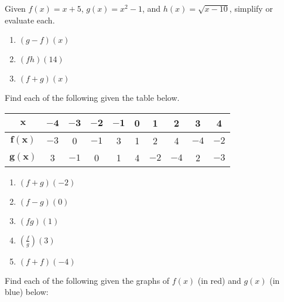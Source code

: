 Given $f(x) = x + 5$, $g(x) = x^2 - 1$, and $h(x) = \sqrt{x-10}$, simplify or evaluate each.
\begin{enumerate}
    \item $(g-f)(x)$
    \item $(fh)(14)$
    \item $(f+g)(x)$
\setcounter{Review}{\value{enumi}}
\end{enumerate}

Find each of the following given the table below.
\begin{center}
\begin{tabular}{c|c|c|c|c|c|c|c|c|c}
    $\bm{x}$ & $\bm{-4}$ & $\bm{-3}$ & $\bm{-2}$ & $\bm{-1}$ & \textbf{0} & \textbf{1} & \textbf{2} & \textbf{3} & \textbf{4} \\ \hline
    $\bm{f(x)}$ & $-3$ & 0 & $-1$ & 3 & 1 & 2 & 4 & $-4$ & $-2$ \\ \hline
    $\bm{g(x)}$ & 3 & $-1$ & 0 & 1 & 4 & $-2$ & $-4$ & 2 & $-3$ \\
\end{tabular}
\end{center}

\begin{multicols}{5}
\begin{enumerate}	\setcounter{enumi}{\value{Review}}
	\item $(f + g)(-2)$
	\item $(f - g)(0)$
	\item $(fg)(1)$
	\item $\left(\frac{f}{g}\right)(3)$
	\item $(f + f)(-4)$
\setcounter{Review}{\value{enumi}}
\end{enumerate}
\end{multicols}

Find each of the following given the graphs of $f(x)$ (in red) and $g(x)$ (in blue) below:    \newline\\

\begin{center}
\end{center}

